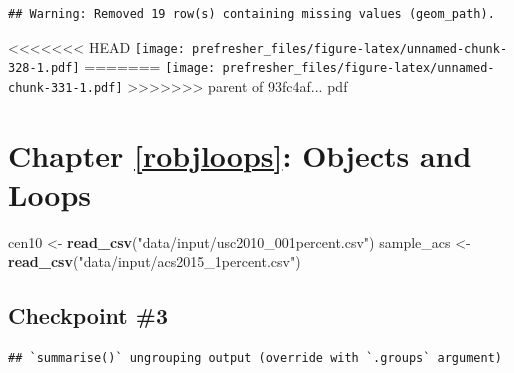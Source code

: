 \documentclass[]{book}
\newenvironment{Shaded}{\begin{snugshade}}{\end{snugshade}}
\newcommand{\DataTypeTok}[1]{\textcolor[rgb]{0.13,0.29,0.53}{#1}}
\newcommand{\DecValTok}[1]{\textcolor[rgb]{0.00,0.00,0.81}{#1}}
\newcommand{\KeywordTok}[1]{\textcolor[rgb]{0.13,0.29,0.53}{\textbf{#1}}}
\newcommand{\NormalTok}[1]{#1}
\newcommand{\OperatorTok}[1]{\textcolor[rgb]{0.81,0.36,0.00}{\textbf{#1}}}
\newcommand{\StringTok}[1]{\textcolor[rgb]{0.31,0.60,0.02}{#1}}
\theoremstyle{definition}
\theoremstyle{definition}
\theoremstyle{definition}
\theoremstyle{remark}
\begin{document}
\begin{Shaded}
\begin{Highlighting}[]
\begin{Shaded}
\begin{Highlighting}[]
\begin{Shaded}
\begin{Highlighting}[]
\begin{verbatim}
## Warning: Removed 19 row(s) containing missing values (geom_path).
\end{verbatim}

<<<<<<< HEAD
\texttt{[image: prefresher\_files/figure-latex/unnamed-chunk-328-1.pdf]}
=======
\texttt{[image: prefresher\_files/figure-latex/unnamed-chunk-331-1.pdf]}
>>>>>>> parent of 93fc4af... pdf

\hypertarget{chapter-refrobjloops-objects-and-loops}{%
\section{Chapter \ref{robjloops}: Objects and Loops}\label{chapter-refrobjloops-objects-and-loops}}

\begin{Shaded}
\begin{Highlighting}[]
\NormalTok{cen10 <-}\StringTok{ }\KeywordTok{read_csv}\NormalTok{(}\StringTok{"data/input/usc2010_001percent.csv"}\NormalTok{)}
\NormalTok{sample_acs <-}\StringTok{ }\KeywordTok{read_csv}\NormalTok{(}\StringTok{"data/input/acs2015_1percent.csv"}\NormalTok{)}
\end{Highlighting}
\end{Shaded}

\hypertarget{checkpoint-3}{%
\subsection*{Checkpoint \#3}\label{checkpoint-3}}

\begin{Shaded}
\end{Shaded}

\begin{verbatim}
## `summarise()` ungrouping output (override with `.groups` argument)
\end{verbatim}


\end{Highlighting}
\end{Shaded}
\end{Highlighting}
\end{Shaded}
\end{Highlighting}
\end{Shaded}
\end{document}
